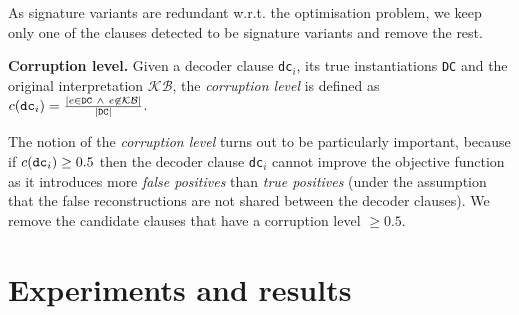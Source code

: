 As signature variants are redundant w.r.t. the optimisation problem, we keep only one of the clauses detected to be signature variants and remove the rest.


\begin{definition}
\textbf{Corruption level.}
Given a decoder clause \texttt{dc}$_i$, its true instantiations \texttt{DC} and the original interpretation $\mathcal{KB}$, the \textit{corruption level} is defined as $c(\text{\texttt{dc}}_i) = \frac{|e \in \texttt{DC}\ \wedge\ e \not \in \mathcal{KB}|}{|\text{\texttt{DC}}|}$.
\end{definition}

The notion of the \textit{corruption level} turns out to be particularly important, because if $c(\text{\texttt{dc}}_i) \geq 0.5$ then the decoder clause \texttt{dc}$_i$ cannot improve the objective function as it introduces more \textit{false positives} than \textit{true positives} (under the assumption that the false reconstructions are not shared between the decoder clauses).
We remove the candidate clauses that have a corruption level $\geq 0.5$.







\section{Experiments and results}




